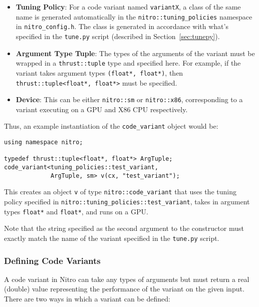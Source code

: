 \documentclass[12pt]{article}
\begin{document}
\begin{itemize}
  \item \textbf{Tuning Policy}: For a code variant named \texttt{variantX}, a class of the
  same name is generated automatically in the \texttt{nitro::tuning\_policies} namespace in
  \texttt{nitro\_config.h}. The class is generated in accordance with what's specified in the
  \texttt{tune.py} script (described in Section~\ref{sec:tunepy}).

  \item \textbf{Argument Type Tuple}: The types of the arguments of the variant must be
  wrapped in a \texttt{thrust::tuple} type and specified here. For example, if the variant
  takes argument types \texttt{(float*, float*)}, then \texttt{thrust::tuple<float*, float*>}
  must be specified.

  \item \textbf{Device}: This can be either \texttt{nitro::sm} or \texttt{nitro::x86}, corresponding
  to a variant executing on a GPU and X86 CPU respectively.
\end{itemize}

Thus, an example instantiation of the \texttt{code\_variant} object would be:

\begin{verbatim}
using namespace nitro;

typedef thrust::tuple<float*, float*> ArgTuple;
code_variant<tuning_policies::test_variant,
             ArgTuple, sm> v(cx, "test_variant");
\end{verbatim}

This creates an object \texttt{v} of type \texttt{nitro::code\_variant}
that uses the tuning policy specified in \texttt{nitro::tuning\_policies::test\_variant},
takes in argument types \texttt{float*} and \texttt{float*}, and runs on a GPU.

Note that the string specified as the second argument to the constructor
must exactly match the name of the variant specified in the \texttt{tune.py} script.

\subsubsection{Defining Code Variants}
A code variant in Nitro can take any types of arguments but must return a real (double)
value representing the performance of the variant on the given input. There are two
ways in which a variant can be defined:
\end{document}
